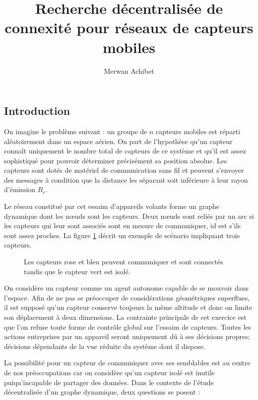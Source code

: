 \documentclass[10pt]{article}
\title{Recherche décentralisée de connexité pour réseaux de capteurs mobiles}
\author{Merwan Achibet}
\date{}
\begin{document}
\maketitle

\begin{multicols}{2}

\section{Introduction}

On imagine le problème suivant : un groupe de $n$ capteurs mobiles est
réparti aléatoirement dans un espace aérien. On part de l'hypothèse
qu'un capteur connaît uniquement le nombre total de capteurs de ce
système et qu'il est assez sophistiqué pour pouvoir déterminer
précisément sa position absolue. Les capteurs sont dotés de matériel
de communication sans fil et peuvent s'envoyer des messages à
condition que la distance les séparant soit inférieure à leur rayon
d'émission $R_c$.

Le réseau constitué par cet essaim d'appareils volants forme un graphe
dynamique dont les n\oe uds sont les capteurs. Deux n\oe uds sont
reliés par un arc si les capteurs qui leur sont associés sont en
mesure de communiquer, id est s'ils sont assez proches. La figure
\ref{communication} décrit un exemple de scénario impliquant trois
capteurs.

\begin{figure}[H]

  \centering

  

  \caption{Les capteurs rose et bleu peuvent communiquer et sont
    connectés tandis que le capteur vert est isolé.}
  \label{communication}

\end{figure}

On considère un capteur comme un agent autonome capable de se mouvoir
dans l'espace. Afin de ne pas se préoccuper de considérations
géométriques superflues, il est supposé qu'un capteur conserve
toujours la même altitude et donc on limite son déplacement à deux
dimensions. La contrainte principale de cet exercice est que l'on
refuse toute forme de contrôle global sur l'essaim de capteurs. Toutes
les actions entreprises par un appareil seront uniquement dû à ses
décisions propres; décisions dépendants de la vue réduite du système
dont il dispose.

La possibilité pour un capteur de communiquer avec ses semblables est
au centre de nos préoccupations car on considère qu'un capteur isolé
est inutile puiqu'incapable de partager des données. Dans le contexte
de l'étude décentralisée d'un graphe dynamique, deux questions se
posent :


\end{multicols}
\end{document}
